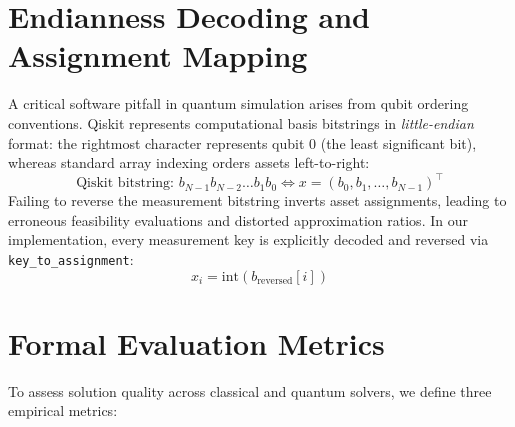 \section{Endianness Decoding and Assignment Mapping}
A critical software pitfall in quantum simulation arises from qubit ordering conventions. Qiskit represents computational basis bitstrings in \textit{little-endian} format: the rightmost character represents qubit 0 (the least significant bit), whereas standard array indexing orders assets left-to-right:
\begin{equation}
\text{Qiskit bitstring: } b_{N-1} b_{N-2} \dots b_1 b_0 \iff x = (b_0, b_1, \dots, b_{N-1})^\top
\end{equation}
Failing to reverse the measurement bitstring inverts asset assignments, leading to erroneous feasibility evaluations and distorted approximation ratios. In our implementation, every measurement key is explicitly decoded and reversed via \texttt{key\_to\_assignment}:
\begin{equation}
x_i = \text{int}(b_{\text{reversed}}[i])
\end{equation}

\section{Formal Evaluation Metrics}
To assess solution quality across classical and quantum solvers, we define three empirical metrics:

